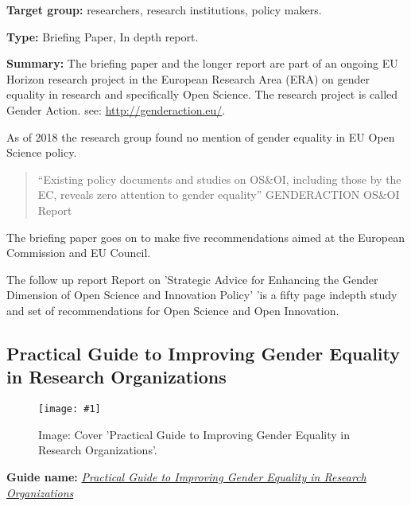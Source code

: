 \documentclass{article}
\newlength{\imgwidth}
\newcommand\scaledgraphics[2]{%
                
\settowidth{\imgwidth}{\texttt{[image: \#1]}}%
                
\setlength{\imgwidth}{\minof{\imgwidth}{#2\textwidth}}%
                
\texttt{[image: \#1]}%
                
}
\begin{document}
\textbf{Target group: }researchers, research institutions, policy makers. 


\textbf{Type:} Briefing Paper, In depth report.


\textbf{Summary:} The briefing paper and the longer report are part of an ongoing EU Horizon research project in the European Research Area (ERA) on gender equality in research and specifically Open Science. The research project is called Gender Action. see: \href{http://genderaction.eu/}{http://genderaction.eu/}.


As of 2018 the research group found no mention of gender equality in EU Open Science policy.

\begin{quote}



“Existing policy documents and studies on OS\&OI, including those by the EC, reveals zero attention to gender equality” GENDERACTION OS\&OI Report


\end{quote}


The briefing paper goes on to make five recommendations aimed at the European Commission and EU Council.


The follow up report Report on 'Strategic Advice for Enhancing the Gender Dimension of Open Science and Innovation Policy' 'is a fifty page indepth study and set of recommendations for Open Science and Open Innovation.


\subsection{Practical Guide to Improving Gender Equality in Research Organizations}\label{H2478521}



\begin{center}
\begin{figure}
\scaledgraphics{2d74c16d-6a0e-48c6-a149-1074544f4a51.jpg}{0.75}
\caption*{Image: Cover 'Practical Guide to Improving Gender Equality in Research Organizations'.}\label{F3238931}
\end{figure}


\end{center}


\textbf{Guide name: }\emph{\href{https://www.fosteropenscience.eu/content/practical-guide-improving-gender-equality-research-organisations}{Practical Guide to Improving Gender Equality in Research Organizations}}\emph{ }\autocite{science_europe_practical_nodate} 
\end{document}
